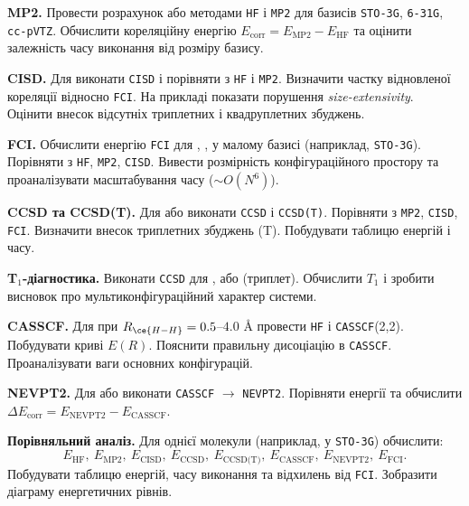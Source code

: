 \begin{tasks}
	\item \textbf{MP2.} Провести розрахунок  або  методами \texttt{HF} і \texttt{MP2} для базисів \texttt{STO-3G}, \texttt{6-31G}, \texttt{cc-pVTZ}. Обчислити кореляційну енергію $E_{\text{corr}} = E_{\text{MP2}} - E_{\text{HF}}$ та оцінити залежність часу виконання від розміру базису.

	\item \textbf{CISD.} Для  виконати \texttt{CISD} і порівняти з \texttt{HF} і \texttt{MP2}. Визначити частку відновленої кореляції відносно \texttt{FCI}. На прикладі  показати порушення \emph{size-extensivity}. Оцінити внесок відсутніх триплетних і квадруплетних збуджень.

	\item \textbf{FCI.} Обчислити енергію \texttt{FCI} для , ,  у малому базисі (наприклад, \texttt{STO-3G}). Порівняти з \texttt{HF}, \texttt{MP2}, \texttt{CISD}. Вивести розмірність конфігураційного простору та проаналізувати масштабування часу ($\sim O(N^6)$).

	\item \textbf{CCSD та CCSD(T).} Для  або  виконати \texttt{CCSD} і \texttt{CCSD(T)}. Порівняти з \texttt{MP2}, \texttt{CISD}, \texttt{FCI}. Визначити внесок триплетних збуджень (T). Побудувати таблицю енергій і часу.

	\item \textbf{T$_1$-діагностика.} Виконати \texttt{CCSD} для ,  або  (триплет). Обчислити $T_1$ і зробити висновок про мультиконфігураційний характер системи.

	\item \textbf{CASSCF.} Для  при $R_{\ce{H-H}} = 0.5$–$4.0$ Å провести \texttt{HF} і \texttt{CASSCF}(2,2). Побудувати криві $E(R)$. Пояснити правильну дисоціацію в \texttt{CASSCF}. Проаналізувати ваги основних конфігурацій.

	\item \textbf{NEVPT2.} Для  або  виконати \texttt{CASSCF} $\to$ \texttt{NEVPT2}. Порівняти енергії та обчислити $\Delta E_{\text{corr}} = E_{\text{NEVPT2}} - E_{\text{CASSCF}}$.

	\item \textbf{Порівняльний аналіз.} Для однієї молекули (наприклад,  у \texttt{STO-3G}) обчислити:
	      \[
	      E_{\text{HF}},\ E_{\text{MP2}},\ E_{\text{CISD}},\ E_{\text{CCSD}},\ E_{\text{CCSD(T)}},\ E_{\text{CASSCF}},\ E_{\text{NEVPT2}},\ E_{\text{FCI}}.
	      \]
	      Побудувати таблицю енергій, часу виконання та відхилень від \texttt{FCI}. Зобразити діаграму енергетичних рівнів.
\end{tasks}
